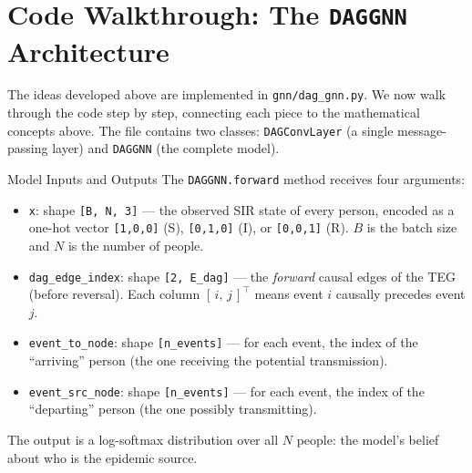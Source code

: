 \section{Code Walkthrough: The \texttt{DAGGNN} Architecture}
\label{sec:dag_gnn_code}

The ideas developed above are implemented in
\texttt{gnn/dag\_gnn.py}. We now walk through the code step by step, connecting
each piece to the mathematical concepts above. The file contains two classes:
\texttt{DAGConvLayer} (a single message-passing layer) and \texttt{DAGGNN} (the
complete model).

\begin{conceptbox}{Model Inputs and Outputs}
The \texttt{DAGGNN.forward} method receives four arguments:
\begin{itemize}[noitemsep]
    \item \texttt{x}: shape \texttt{[B, N, 3]} --- the observed SIR state of
          every person, encoded as a one-hot vector \texttt{[1,0,0]} (S),
          \texttt{[0,1,0]} (I), or \texttt{[0,0,1]} (R). $B$ is the batch size
          and $N$ is the number of people.
    \item \texttt{dag\_edge\_index}: shape \texttt{[2, E\_dag]} --- the
          \emph{forward} causal edges of the TEG (before reversal). Each column
          $[\,i,\,j\,]^\top$ means event $i$ causally precedes event $j$.
    \item \texttt{event\_to\_node}: shape \texttt{[n\_events]} --- for each
          event, the index of the ``arriving'' person (the one receiving the
          potential transmission).
    \item \texttt{event\_src\_node}: shape \texttt{[n\_events]} --- for each
          event, the index of the ``departing'' person (the one possibly
          transmitting).
\end{itemize}
The output is a log-softmax distribution over all $N$ people: the model's
belief about who is the epidemic source.
\end{conceptbox}

